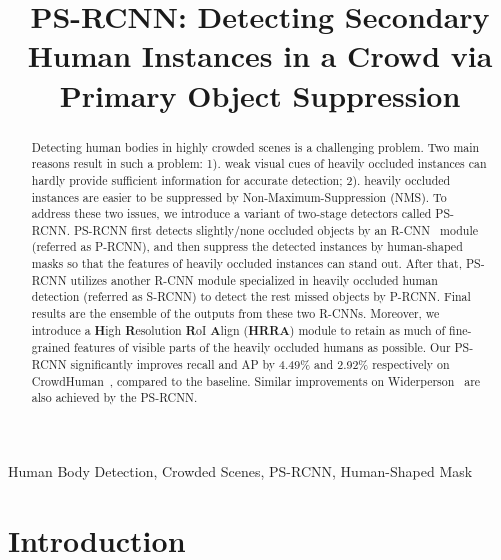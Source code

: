 \documentclass{article}
\begin{document}
\sloppy



\def\x{{\mathbf x}}
\def\L{{\cal L}}


\title{PS-RCNN: Detecting Secondary Human Instances in a Crowd via Primary Object Suppression}

\address{Waseda University, National University of Singapore \\
         \textit{\{jokerzz@fuji, koushin@toki, yoshie@\}.waseda.jp, \{zequn.nus,  xurong1981\}@gmail.com}}


\maketitle

\begin{abstract}
Detecting human bodies in highly crowded scenes is a challenging problem. Two main reasons result in such a problem: 1). weak visual cues of heavily occluded instances can hardly provide sufficient information for accurate detection; 2). heavily occluded instances are easier to be suppressed by Non-Maximum-Suppression (NMS). To address these two issues, we introduce a variant of two-stage detectors called PS-RCNN. PS-RCNN first detects slightly/none occluded objects by an R-CNN~\cite{girshick2014rich} module (referred as P-RCNN), and then suppress the detected instances by human-shaped masks so that the features of heavily occluded instances can stand out. After that, PS-RCNN utilizes another R-CNN module specialized in heavily occluded human detection (referred as S-RCNN) to detect the rest missed objects by P-RCNN. Final results are the ensemble of the outputs from these two R-CNNs. Moreover, we introduce a \textbf{H}igh \textbf{R}esolution \textbf{R}oI \textbf{A}lign (\textbf{HRRA}) module to retain as much of fine-grained features of visible parts of the heavily occluded humans as possible. Our PS-RCNN significantly improves recall and AP by 4.49\% and 2.92\% respectively on CrowdHuman~\cite{CrowdHuman}, compared to the baseline. Similar improvements on Widerperson~\cite{Zhang2019WiderPerson} are also achieved by the PS-RCNN. 
\end{abstract}
\begin{keywords}
Human Body Detection, Crowded Scenes, PS-RCNN, Human-Shaped Mask
\end{keywords}
\section{Introduction}
\label{sec:intro}
\vspace{-0.2cm}
\end{document}
